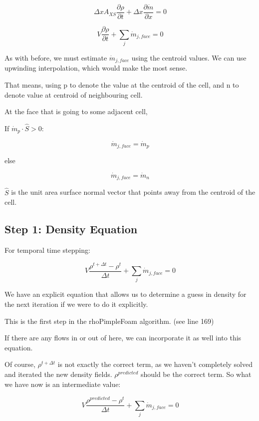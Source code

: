 \documentclass[masters]{ucbthesis}
\renewcommand{\_}{\kern-1.5pt\textunderscore\kern-1.5pt}
\begin{document}
\begin{equation*} 
	\Delta x A_{XS} \frac{\partial \rho}{\partial t} 
	+ \Delta x \frac{\partial \dot{m}}{\partial x} = 0
\end{equation*}

\begin{equation*} 
	V \frac{\partial \rho}{\partial t} 
	+ \sum_j \dot{m}_{j, face} = 0
\end{equation*}

As with before, we must estimate $\dot{m}_{j,face}$ using the centroid 
values. We can use upwinding interpolation, which would make the most sense.

That means, using p to denote the value at the centroid of the cell,
and n to denote value at centroid of neighbouring cell.

At the face that is going to some adjacent cell,

If $\dot{m}_p \cdot \hat{S} > 0$:

$$\dot{m}_{j,face} = \dot{m}_p$$

else 


$$\dot{m}_{j,face} = \dot{m}_n$$

$\hat{S}$ is the unit area surface normal vector that points away from the 
centroid of the cell.

\subsection{Step 1: Density Equation}
For temporal time stepping:

\begin{equation*} 
	V \frac{\rho^{t + \Delta t} - \rho^t}{\Delta t} 
	+ \sum_j \dot{m}_{j, face} = 0
\end{equation*}

We have an explicit equation that allows us to determine a guess 
in density for the next iteration if we were to do it explicitly.

This is the first step in the rhoPimpleFoam algorithm. (see line 169)

If there are any flows in or out of here, we can incorporate it as 
well into this equation.

Of course, $\rho^{t + \Delta t}$ is not exactly the correct term, 
as we haven't completely solved and iterated the new density fields.
$\rho^{predicted}$ should be the correct term. So what we have now 
is an intermediate value:

\begin{equation*} 
	V \frac{\rho^{predicted} - \rho^t}{\Delta t} 
	+ \sum_j \dot{m}_{j, face} = 0
\end{equation*}
\end{document}
